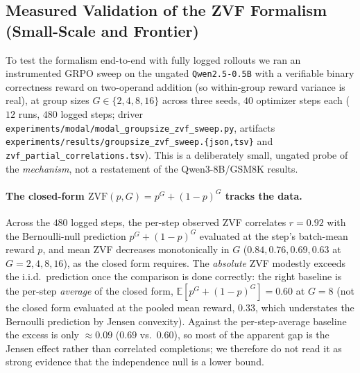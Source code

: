 \documentclass{article}
\begin{document}
\subsection{Measured Validation of the ZVF Formalism (Small-Scale and Frontier)}
\label{sec:appendix:zvf-measured}

To test the formalism end-to-end with fully logged rollouts we ran an
instrumented GRPO sweep on the ungated \texttt{Qwen2.5-0.5B} with a verifiable
binary correctness reward on two-operand addition (so within-group reward
variance is real), at group sizes $G \in \{2,4,8,16\}$ across three seeds, $40$
optimizer steps each ($12$ runs, $480$ logged steps; driver
\texttt{experiments/modal/modal\_groupsize\_zvf\_sweep.py}, artifacts
\texttt{experiments/results/groupsize\_zvf\_sweep.\{json,tsv\}} and
\texttt{zvf\_partial\_correlations.tsv}). This is a deliberately small,
ungated probe of the \emph{mechanism}, not a restatement of the
Qwen3-8B/GSM8K results.

\paragraph{The closed-form $\mathrm{ZVF}(p,G)=p^{G}+(1-p)^{G}$ tracks the data.}
Across the $480$ logged steps, the per-step observed ZVF correlates
$r=0.92$ with the Bernoulli-null prediction $p^{G}+(1-p)^{G}$ evaluated at the
step's batch-mean reward $p$, and mean ZVF decreases monotonically in $G$
($0.84, 0.76, 0.69, 0.63$ at $G=2,4,8,16$), as the closed form requires. The
\emph{absolute} ZVF modestly exceeds the i.i.d.\ prediction once the comparison
is done correctly: the right baseline is the per-step \emph{average} of the
closed form, $\mathbb{E}[p^{G}+(1-p)^{G}]=0.60$ at $G{=}8$ (not the closed form
evaluated at the pooled mean reward, $0.33$, which understates the Bernoulli
prediction by Jensen convexity). Against the per-step-average baseline the excess
is only $\approx 0.09$ ($0.69$ vs.\ $0.60$), so most of the apparent gap is the
Jensen effect rather than correlated completions; we therefore do not read it as
strong evidence that the independence null is a lower bound.
\end{document}
